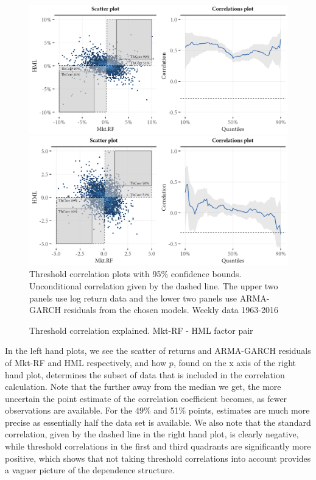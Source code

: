 \begin{figure}[htbp]
  \caption{Threshold correlation explained. Mkt-RF - HML factor pair}
  \label{fig:illustrate_threshold}
  \centering
  \begin{minipage}{\textwidth}
  \includegraphics[scale=1]{graphics/threshold_explain_ret.png}  
  \includegraphics[scale=1]{graphics/threshold_explain_res.png}  
  \vspace{3mm}
  \footnotesize
  Threshold correlation plots with 95\% confidence bounds. Unconditional correlation given by the dashed line. The upper two panels use log return data and the lower two panels use ARMA-GARCH residuals from the chosen models. Weekly data 1963-2016
  \end{minipage}
\end{figure}

In the left hand plots, we see the scatter of returns and ARMA-GARCH residuals of Mkt-RF and HML respectively, and how $p$, found on the x axis of the right hand plot, determines the subset of data that is included in the correlation calculation. Note that the further away from the median we get, the more uncertain the point estimate of the correlation coefficient becomes, as fewer observations are available. For the 49\% and 51\% points, estimates are much more precise as essentially half the data set is available. We also note that the standard correlation, given by the dashed line in the right hand plot, is clearly negative, while threshold correlations in the first and third quadrants are significantly more positive, which shows that not taking threshold correlations into account provides a vaguer picture of the dependence structure.

